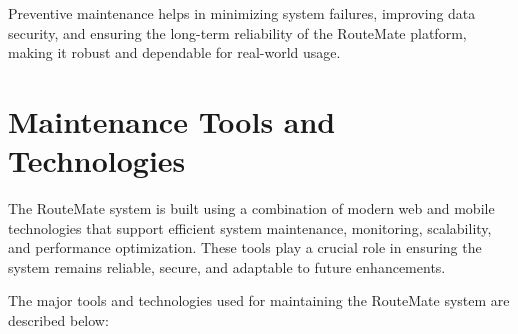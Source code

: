 \documentclass[10pt,a4paper]{report}
\begin{document}
\justify\large Preventive maintenance helps in minimizing system failures, improving data security, and ensuring the long-term reliability of the RouteMate platform, making it robust and dependable for real-world usage.


\section{Maintenance Tools and Technologies}

\justify\large The RouteMate system is built using a combination of modern web and mobile technologies that support efficient system maintenance, monitoring, scalability, and performance optimization. These tools play a crucial role in ensuring the system remains reliable, secure, and adaptable to future enhancements.

\justify\large The major tools and technologies used for maintaining the RouteMate system are described below:
\end{document}

